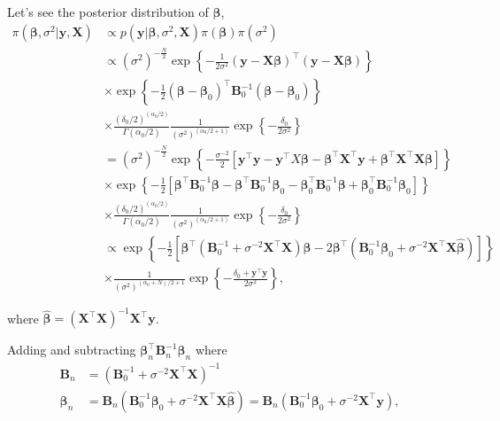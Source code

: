 \begin{enumerate}[leftmargin=*]
Let's see the posterior distribution of $\bm{\beta}$, 
\begin{align*}
	\pi(\bm{\beta}, \sigma^2|{\bm{y}}, {\bm{X}}) & \propto p({\bm{y}}|\bm{\beta}, \sigma^2, {\bm{X}}) \pi(\bm{\beta}) \pi(\sigma^2) \\
	&\propto (\sigma^2)^{-\frac{N}{2}}\exp\left\{-\frac{1}{2\sigma^2}({\bm{y}}-{\bm{X}}\bm{\beta})^{\top}({\bm{y}}-{\bm{X}}\bm{\beta})\right\}\\
	&\times \exp\left\{-\frac{1}{2}(\bm{\beta} - \bm{\beta}_0)^{\top}{\bm{B}}_0^{-1}(\bm{\beta} - \bm{\beta}_0)\right\}\\
	&\times\frac{(\delta_0/2)^{(\alpha_0/2)}}{\Gamma(\alpha_0/2)}\frac{1}{(\sigma^2)^{(\alpha_0/2+1)}}\exp\left\{-\frac{\delta_0}{2\sigma^2}\right\}\\
	&=(\sigma^2)^{-\frac{N}{2}}\exp\left\{-\frac{\sigma^{-2}}{2}[{\bm{y}}^{\top}{\bm{y}}-{\bm{y}}^{\top}X\bm{\beta}-\bm{\beta}^{\top}{\bm{X}}^{\top}{\bm{y}}+\bm{\beta}^{\top}{\bm{X}}^{\top}{\bm{X}}\bm{\beta}]\right\}\\
	& \times \exp\left\{-\frac{1}{2}[\bm{\beta}^{\top}{\bm{B}}_0^{-1}\bm{\beta}-\bm{\beta}^{\top}{\bm{B}}_0^{-1}\bm{\beta}_0-\bm{\beta}_0^{\top}{\bm{B}}_0^{-1}\bm{\beta}+\bm{\beta}_0^{\top}{\bm{B}}_0^{-1}\bm{\beta}_0]\right\}\\
	&\times \frac{(\delta_0/2)^{(\alpha_0/2)}}{\Gamma(\alpha_0/2)}\frac{1}{(\sigma^2)^{(\alpha_0/2+1)}}\exp\left\{-\frac{\delta_0}{2\sigma^2}\right\}\\
	&\propto \exp\left\{-\frac{1}{2}[\bm{\beta}^{\top}({\bm{B}}_0^{-1}+\sigma^{-2}{\bm{X}}^{\top}{\bm{X}})\bm{\beta}-2\bm{\beta}^{\top}({\bm{B}}_0^{-1}\bm{\beta}_0+\sigma^{-2}{\bm{X}}^{\top}{\bm{X}}\hat{\bm{\beta}})]\right\}\\
	&\times\frac{1}{(\sigma^2)^{(\alpha_0+N)/2+1}}\exp\left\{-\frac{\delta_0+{\bm{y}}^{\top}{\bm{y}}}{2\sigma^2}\right\},
\end{align*}

where $\hat{\bm{\beta}}=({\bm{X}}^{\top}{\bm{X}})^{-1}{\bm{X}}^{\top}{\bm{y}}$.

Adding and subtracting $\bm{\beta}_n^{\top}{\bm{B}}_n^{-1}\bm{\beta}_n$ where
\begin{align*}
	{\bm{B}}_n & = ({\bm{B}}_0^{-1}+\sigma^{-2}{\bm{X}}^{\top}{\bm{X}})^{-1}\\
	\bm{\beta}_n&={\bm{B}}_n({\bm{B}}_0^{-1}\bm{\beta}_0+\sigma^{-2}{\bm{X}}^{\top}{\bm{X}}\hat{\bm{\beta}})={\bm{B}}_n({\bm{B}}_0^{-1}\bm{\beta}_0+\sigma^{-2}{\bm{X}}^{\top}{\bm{y}}),
\end{align*}


\end{enumerate}

